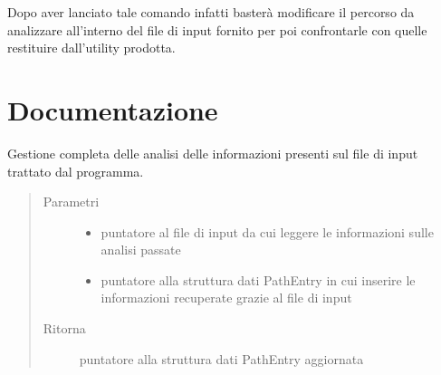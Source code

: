 \documentclass[letterpaper,10pt,italian,openany,oneside]{sphinxmanual}
\begin{document}
Dopo aver lanciato tale comando infatti basterà modificare il percorso da analizzare all’interno del file di input fornito
per poi confrontarle con quelle restituire dall’utility prodotta.


\chapter{Documentazione}
\label{\detokenize{documentazione:documentazione}}\label{\detokenize{documentazione::doc}}

\begin{fulllineitems}
\label{\detokenize{documentazione:c.readInputFile}}
Gestione completa delle analisi delle informazioni presenti sul file di input trattato dal programma.
\begin{quote}\begin{description}
\item[{Parametri}] \leavevmode\begin{itemize}
\item {} 
 \textendash{} puntatore al file di input da cui leggere le informazioni sulle analisi passate

\item {} 
 \textendash{} puntatore alla struttura dati PathEntry in cui inserire le informazioni recuperate grazie al file di input

\end{itemize}

\item[{Ritorna}] \leavevmode
puntatore alla struttura dati PathEntry aggiornata

\end{description}\end{quote}

\end{fulllineitems}

\end{document}
